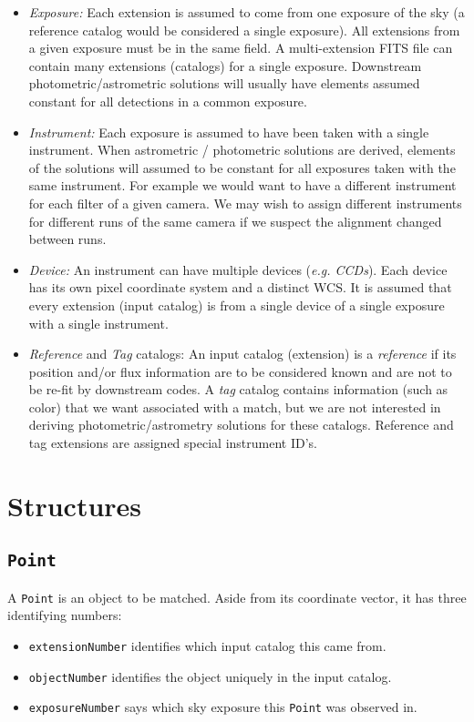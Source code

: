\documentclass[11pt,preprint,flushrt]{aastex}
\begin{document}
\begin{itemize}
\item {\it Exposure:} Each extension is assumed to come from one exposure of the sky (a reference catalog would be considered a single exposure).  All extensions from a given exposure must be in the same field.  A multi-extension FITS file can contain many extensions (catalogs) for a single exposure.  Downstream photometric/astrometric solutions will usually have elements assumed constant for all detections in a common exposure.
\item {\it Instrument:} Each exposure is assumed to have been taken with a single instrument.  When astrometric / photometric solutions are derived, elements of the solutions will assumed to be constant for all exposures taken with the same instrument.  For example we would want to have a different instrument for each filter of a given camera.  We may wish to assign different instruments for different runs of the same camera if we suspect the alignment changed between runs. 
\item {\it Device:} An instrument can have multiple devices ({\it e.g. CCDs}).  Each device has its own pixel coordinate system and a distinct WCS.  It is assumed that every extension (input catalog) is from a single device of a single exposure with a single instrument.
\item {\it Reference} and {\it Tag} catalogs:  An input catalog (extension) is a {\it reference} if its position and/or flux information are to be considered known and are not to be re-fit by downstream codes.  A {\it tag} catalog contains information (such as color) that we want associated with a match, but we are not interested in deriving photometric/astrometry solutions for these catalogs.  Reference and tag extensions are assigned special instrument ID's.
\end{itemize}

\section{Structures}

\subsection{\tt Point}
A {\tt Point} is an object to be matched.  Aside from its coordinate vector, it has three identifying numbers:
\begin{itemize}
\item {\tt extensionNumber} identifies which input catalog this came from.
\item {\tt objectNumber} identifies the object uniquely in the input catalog.
\item {\tt exposureNumber} says which sky exposure this {\tt Point} was observed in.
\end{itemize}
\end{document}
